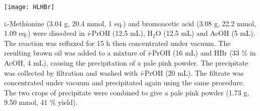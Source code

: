 {{{{{{{{{{%

\begin{scheme}[H]
	\begin{center}
		\texttt{[image: HLHBr]}
	\end{center}
\end{scheme}

\textsc{l}-Methionine (3.04 g, 20.4 mmol, 1 eq.) and bromoacetic acid (3.08 g, 22.2 mmol, 1.09 eq.) were dissolved in \textit{i}-PrOH (12.5 mL), H$_2$O (12.5 mL) and AcOH (5 mL). The reaction was refluxed for 15 h then concentrated under vacuum. The resulting brown oil was added to a mixture of \textit{i}-PrOH (16 mL) and HBr (33 \% in AcOH, 4 mL), causing the precipitation of a pale pink powder. The precipitate was collected by filtration and washed with \textit{i}-PrOH (20 mL). The filtrate was concentrated under vacuum and precipitated again using the same procedure. The two crops of precipitate were combined to give a pale pink powder (1.73 g, 9.50 mmol, 41 \% yield).
\\[1\baselineskip]
\\[1\baselineskip]
\\[1\baselineskip]
\\[1\baselineskip]
}}}}}}}}}}
